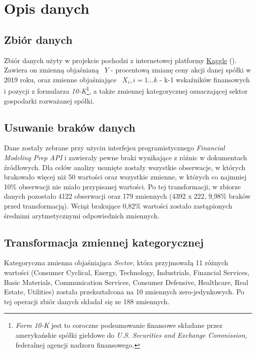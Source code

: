 \documentclass{article}
\begin{document}
\newpage
\section{Opis danych}

\subsection{Zbiór danych}
Zbiór danych użyty w projekcie pochodzi z internetowej platformy \href{https://www.kaggle.com/cnic92/200-financial-indicators-of-us-stocks-20142018}{Kaggle} (\textcite{Carbone2019}). Zawiera on zmienną objaśnianą ~$Y$ - procentową zmianę ceny akcji danej spółki w 2019 roku, oraz zmienne objaśniające ~$X_i,  i=1\dots k$ - k-1 wskaźników finansowych i pozycji z formularza \textit{10-K}\footnote{\textit{Form 10-K} jest to coroczne podsumowanie finansowe składane przez amerykańskie spółki giełdowe do \textit{U.S. Securities and Exchange Commission}, federalnej agencji nadzoru finansowego.}, a także zmiennej kategorycznej oznaczającej sektor gospodarki rozważanej spółki.

\subsection{Usuwanie braków danych}
Dane zostały zebrane przy użyciu interfejsu programistycznego \textit{Financial Modeling Prep API} i zawierały pewne braki wynikające z różnic w dokumentach źródłowych. Dla celów analizy usunięte zostały wszystkie obserwacje, w których brakowało więcej niż 50 wartości oraz wszystkie zmienne, w których co najmniej 10\% obserwacji nie miało przypisanej wartości. Po tej transformacji, w zbiorze danych pozostało 4122 obserwacji oraz 179 zmiennych (4392 x 222, 9,98\% braków przed transformacją). Wciąż brakujące 0,82\% wartości zostało zastąpionych średnimi arytmetycznymi odpowiednich zmiennych.

\subsection{Transformacja zmiennej kategorycznej}
Kategoryczna zmienna objaśniająca \textit{Sector}, która przyjmowałą 11 różnych wartości (Consumer Cyclical, Energy, Technology, Industrials, Financial Services, Basic Materials, Communication Services, Consumer Defensive, Healthcare, Real Estate, Utilities) została przekształcona na 10 zmiennych zero-jedynkowych. Po tej operacji zbiór danych składał się ze 188 zmiennych.
\end{document}
